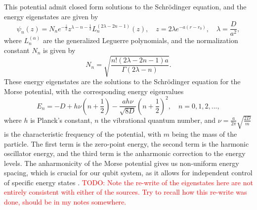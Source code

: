 \documentclass{subfiles}
\begin{document}
This potential admit closed form solutions to the Schrödinger equation, and the energy eigenstates are given by
\begin{equation}
    \psi_n(z) = N_n e^{-\frac{z}{2}}z^{\lambda - n - \frac{1}{2}}L_n^{(2\lambda - 2n - 1)}(z), \quad z = 2\lambda e^{-a(r-r_0)}, \quad \lambda = \frac{D}{a^2},\label{eq:morse_eigenstates}
\end{equation}
where $L_n^{(\alpha)}$ are the generalized Leguerre polynomials, and the normalization constant $N_n$ is given by
\begin{equation*}
    N_n = \sqrt{\frac{n! (2\lambda - 2n - 1)a}{\Gamma(2\lambda - n)}}.
\end{equation*}
These energy eigenstates are the solutions to the Schrödinger equation for the Morse potential, with the corresponding energy eigenvalues
\begin{equation}
    E_n = -D + h\nu(n + \frac{1}{2}) - \frac{ah\nu}{\sqrt{8D}}(n + \frac{1}{2})^2, \quad n = 0, 1, 2, ...\label{eq:morse_energy_levels},
\end{equation}
where $h$ is Planck's constant, $n$ the vibrational quantum number, and $\nu=\frac{a}{2\pi}\sqrt{\frac{2D}{m}}$ is the characteristic frequency of the potential, with $m$ being the mass of the particle. The first term is the zero-point energy, the second term is the harmonic oscillator energy, and the third term is the anharmonic correction to the energy levels. The anharmonicity of the Morse potential gives us non-uniform energy spacing, which is crucial for our qubit system, as it allows for independent control of specific energy states \cite{piela2006ideas, morse1929diatomic}. \textcolor{red}{TODO: Note the re-write of the eigenstates here are not entirely consistent with either of the sources. Try to recall how this re-write was done, should be in my notes somewhere.}

\end{document}
